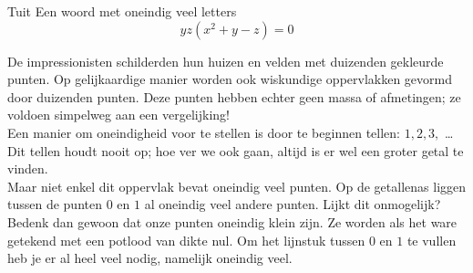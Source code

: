 \begin{surferPage}{Tuit}
Een woord met oneindig veel letters\\
\smallskip
\[y z (x^2	+ y - z)	= 0\]

\vspace{0.3cm}
De impressionisten schilderden hun huizen en velden met duizenden gekleurde punten. Op gelijkaardige manier worden ook wiskundige oppervlakken gevormd door duizenden punten. Deze punten hebben echter geen massa of afmetingen; ze voldoen simpelweg aan een vergelijking!\\
\vspace{0.3cm}
Een manier om oneindigheid voor te stellen is door te beginnen tellen: $1, 2, 3,$ \dots\\
Dit tellen houdt nooit op; hoe ver we ook gaan, altijd is er wel een groter getal te vinden.\\
\vspace{0.3cm}
Maar niet enkel dit oppervlak bevat oneindig veel punten. Op de getallenas liggen tussen de punten $0$ en $1$ al oneindig veel andere punten. Lijkt dit onmogelijk? Bedenk dan gewoon dat onze punten oneindig klein zijn. Ze worden als het ware getekend met een potlood van dikte nul. Om het lijnstuk tussen $0$ en $1$ te vullen heb je er al heel veel nodig, namelijk oneindig veel.
\end{surferPage}
